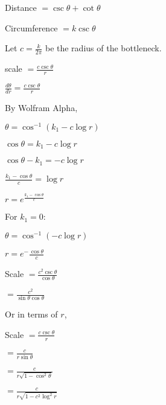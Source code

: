 Distance $= \csc\theta + \cot\theta$

Circumference $= k\csc\theta$

Let $c = \frac{k}{2\pi}$ be the radius of the bottleneck.

scale $= \frac{c\csc\theta}{r}$


$\frac{d\theta}{dr} = \frac{c\csc\theta}{r}$

By Wolfram Alpha,

$\theta = \cos^{-1}(k_1 - c\log r)$

$\cos\theta = k_1 - c\log r$

$\cos\theta - k_1 = -c\log r$

$\frac{k_1 - \cos\theta}{c} = \log r$

$r = e^\frac{k_1 - \cos\theta}{c}$

For $k_1 = 0$:

$\theta = \cos^{-1}(-c\log r)$

$r = e^-\frac{\cos\theta}{c}$

Scale $= \frac{c^2\csc\theta}{\cos\theta}$

$= \frac{c^2}{\sin\theta\cos\theta}$

Or in terms of $r$,

Scale $= \frac{c\csc\theta}{r}$

$= \frac{c}{r\sin\theta}$

$= \frac{c}{r\sqrt{1-\cos^2\theta}}$

$= \frac{c}{r\sqrt{1-c^2 \log^2 r}}$

